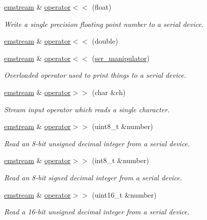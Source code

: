 \begin{DoxyCompactItemize}
\mbox{\hyperlink{classemstream}{emstream}} \& \mbox{\hyperlink{classemstream_ab0ea0ed8ea67a4182d526bdae23d4594}{operator$<$$<$}} (float)
\begin{DoxyCompactList}\small\item\em Write a single precision floating point number to a serial device. \end{DoxyCompactList}\item 
\mbox{\hyperlink{classemstream}{emstream}} \& \mbox{\hyperlink{classemstream_a14caec5bbf12dd25ae39c72a95bebf0b}{operator$<$$<$}} (double)
\item 
\mbox{\hyperlink{classemstream}{emstream}} \& \mbox{\hyperlink{classemstream_a10a043d75a8d229974282c0bac207dab}{operator$<$$<$}} (\mbox{\hyperlink{emstream_8h_a5582483c459c0f48e51d96478d5b3407}{ser\+\_\+manipulator}})
\begin{DoxyCompactList}\small\item\em Overloaded operator used to print things to a serial device. \end{DoxyCompactList}\item 
\mbox{\hyperlink{classemstream}{emstream}} \& \mbox{\hyperlink{classemstream_a67dc7f8341184dffa95daf0104406e17}{operator$>$$>$}} (char \&ch)
\begin{DoxyCompactList}\small\item\em Stream input operator which reads a single character. \end{DoxyCompactList}\item 
\mbox{\hyperlink{classemstream}{emstream}} \& \mbox{\hyperlink{classemstream_ab27cadcdfb7256a05c2474c954fd02b8}{operator$>$$>$}} (uint8\+\_\+t \&number)
\begin{DoxyCompactList}\small\item\em Read an 8-\/bit unsigned decimal integer from a serial device. \end{DoxyCompactList}\item 
\mbox{\hyperlink{classemstream}{emstream}} \& \mbox{\hyperlink{classemstream_a8dfe916d7db9331beaf5dc98b6c5b9ea}{operator$>$$>$}} (int8\+\_\+t \&number)
\begin{DoxyCompactList}\small\item\em Read an 8-\/bit signed decimal integer from a serial device. \end{DoxyCompactList}\item 
\mbox{\hyperlink{classemstream}{emstream}} \& \mbox{\hyperlink{classemstream_a5735ebb0098bafd1e653e1ca2b4885b1}{operator$>$$>$}} (uint16\+\_\+t \&number)
\begin{DoxyCompactList}\small\item\em Read a 16-\/bit unsigned decimal integer from a serial device. \end{DoxyCompactList}\item 

\end{DoxyCompactItemize}
